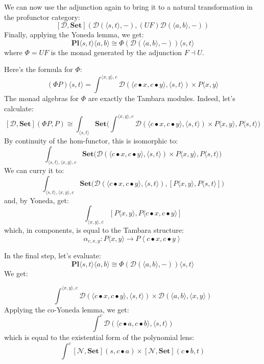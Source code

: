 \documentclass[11pt]{amsart}
\begin{document}
We can now use the adjunction again to bring it to a natural transformation in the profunctor category:
\[  [\mathcal{D}, \mathbf{Set}]  ( \mathcal{D}( \langle s, t \rangle, -), (U F) \mathcal{D}( \langle a, b \rangle, -)) \]
Finally, applying the Yoneda lemma, we get:
\[  \mathbf{Pl}\langle s, t\rangle \langle a, b\rangle \cong \Phi (\mathcal{D}( \langle a, b \rangle, -)) \langle s, t\rangle \]
where $\Phi = U F$ is the monad generated by the adjunction $F \dashv U$. 

 Here's the formula for $\Phi$:
\[ (\Phi P) \langle s, t \rangle = \int^{\langle x, y \rangle, c} \mathcal{D}(\langle c \bullet x, c \bullet y \rangle, \langle s, t \rangle) \times P\langle x, y \rangle \]
The monad algebras for $\Phi$ are exactly the Tambara modules. Indeed, let's calculate:
\[ [\mathcal{D}, \mathbf{Set}] (\Phi P, P) \cong \int_{\langle s, t \rangle} \mathbf{Set} \big( \int^{\langle x, y \rangle, c} \mathcal{D}(\langle c \bullet x, c \bullet y \rangle, \langle s, t \rangle) \times P\langle x, y \rangle, P\langle s, t \rangle \big)\]
By continuity of the hom-functor, this is isomorphic to:
\[ \int_{\langle s, t \rangle, \langle x, y \rangle, c} \mathbf{Set} \big( \mathcal{D}(\langle c \bullet x, c \bullet y \rangle, \langle s, t \rangle) \times P\langle x, y \rangle, P\langle s, t \rangle \big)\]
We can curry it to:
\[ \int_{\langle s, t \rangle, \langle x, y \rangle, c} \mathbf{Set} \big( \mathcal{D}(\langle c \bullet x, c \bullet y \rangle, \langle s, t \rangle), [P\langle x, y \rangle, P\langle s, t \rangle] \big)\]
and, by Yoneda, get:
\[ \int_{\langle x, y \rangle, c} [P\langle x, y \rangle, P\langle c \bullet x, c \bullet y \rangle] \]
which, in components, is equal to the Tambara structure:
\[\alpha_{c, x, y} \colon P\langle x, y \rangle \to P \left \langle c \bullet x, c \bullet y \right \rangle \]

In the final step, let's evaluate:
\[  \mathbf{Pl}\langle s, t\rangle \langle a, b\rangle \cong \Phi (\mathcal{D}( \langle a, b \rangle, -)) \langle s, t\rangle \]
We get:

\[ \int^{\langle x, y \rangle, c} \mathcal{D}(\langle c \bullet x, c \bullet y \rangle, \langle s, t \rangle) \times \mathcal{D}( \langle a, b \rangle, \langle x, y \rangle )\]
Applying the co-Yoneda lemma, we get:
\[ \int^{c} \mathcal{D}(\langle c \bullet a, c \bullet b \rangle, \langle s, t \rangle)\]
which is equal to the existential form of the polynomial lens:
\[ \int^{c} [\mathcal{N}, \mathbf{Set}](s, c \bullet a) \times [\mathcal{N}, \mathbf{Set}]( c \bullet b,  t)\]
\end{document}
